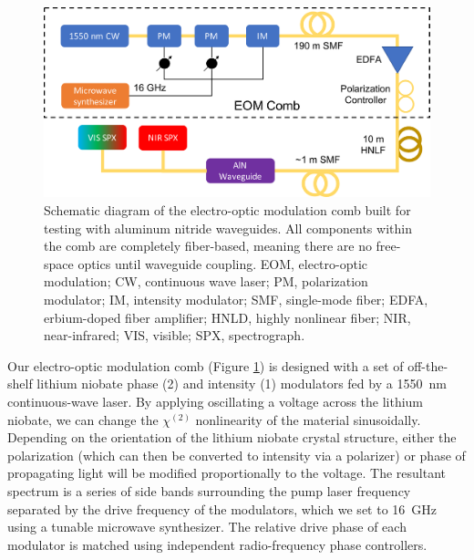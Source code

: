 \begin{figure}
    \centering
    \includegraphics[width=\textwidth]{figures-3/eom-diagram.pdf}
    \caption[Electro-optic modulation comb schematic diagram]{Schematic diagram of the electro-optic modulation comb built for testing with aluminum nitride waveguides. All components within the comb are completely fiber-based, meaning there are no free-space optics until waveguide coupling. EOM, electro-optic modulation; CW, continuous wave laser; PM, polarization modulator; IM, intensity modulator; SMF, single-mode fiber; EDFA, erbium-doped fiber amplifier; HNLD, highly nonlinear fiber; NIR, near-infrared; VIS, visible; SPX, spectrograph.}
    \label{fig:eom-diagram}
\end{figure}

Our electro-optic modulation comb (Figure \ref{fig:eom-diagram}) is designed with a set of off-the-shelf lithium niobate phase (2) and intensity (1) modulators fed by a 1550~\si{\nano\meter} continuous-wave laser. By applying oscillating a voltage across the lithium niobate, we can change the $\chi^{(2)}$ nonlinearity of the material sinusoidally. Depending on the orientation of the lithium niobate crystal structure, either the polarization (which can then be converted to intensity via a polarizer) or phase of propagating light will be modified proportionally to the voltage. The resultant spectrum is a series of side bands surrounding the pump laser frequency separated by the drive frequency of the modulators, which we set to 16~\si{\giga\hertz} using a tunable microwave synthesizer. The relative drive phase of each modulator is matched using independent radio-frequency phase controllers.

